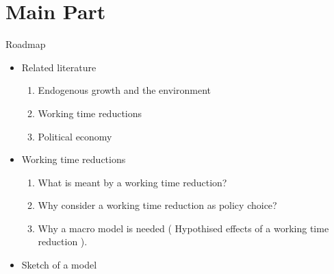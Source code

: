 \documentclass[11pt,aspectratio=169]{beamer}
\begin{document}
\section{Main Part}
\begin{frame}{Roadmap}
\begin{itemize}
\item Related literature %
\begin{enumerate}
\item Endogenous growth and the environment
\item Working time reductions
\item Political economy
\end{enumerate}
\item Working time reductions %
\begin{enumerate}
	\item What is meant by a working time reduction? 
\item Why consider a working time reduction as policy choice? %
\item Why a macro model is needed ( Hypothised effects of a working time reduction ).
\end{enumerate}
\item Sketch of a model %
\end{itemize}
\end{frame}
\end{document}
